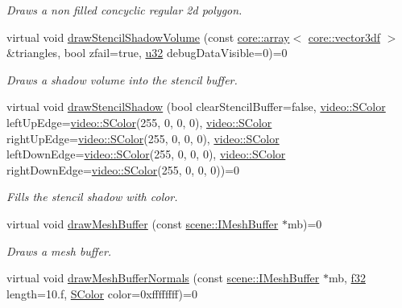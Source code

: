 \begin{DoxyCompactItemize}
\begin{DoxyCompactList}\small\item\em Draws a non filled concyclic regular 2d polygon. \end{DoxyCompactList}\item 
virtual void \hyperlink{classirr_1_1video_1_1IVideoDriver_ae340fe71939b7c1043071507f3330cad}{draw\+Stencil\+Shadow\+Volume} (const \hyperlink{classirr_1_1core_1_1array}{core\+::array}$<$ \hyperlink{namespaceirr_1_1core_a06f169d08b5c429f5575acb7edbad811}{core\+::vector3df} $>$ \&triangles, bool zfail=true, \hyperlink{namespaceirr_a0416a53257075833e7002efd0a18e804}{u32} debug\+Data\+Visible=0)=0
\begin{DoxyCompactList}\small\item\em Draws a shadow volume into the stencil buffer. \end{DoxyCompactList}\item 
virtual void \hyperlink{classirr_1_1video_1_1IVideoDriver_a985ea57c5cf23b7774044f6ed9f96579}{draw\+Stencil\+Shadow} (bool clear\+Stencil\+Buffer=false, \hyperlink{classirr_1_1video_1_1SColor}{video\+::\+S\+Color} left\+Up\+Edge=\hyperlink{classirr_1_1video_1_1SColor}{video\+::\+S\+Color}(255, 0, 0, 0), \hyperlink{classirr_1_1video_1_1SColor}{video\+::\+S\+Color} right\+Up\+Edge=\hyperlink{classirr_1_1video_1_1SColor}{video\+::\+S\+Color}(255, 0, 0, 0), \hyperlink{classirr_1_1video_1_1SColor}{video\+::\+S\+Color} left\+Down\+Edge=\hyperlink{classirr_1_1video_1_1SColor}{video\+::\+S\+Color}(255, 0, 0, 0), \hyperlink{classirr_1_1video_1_1SColor}{video\+::\+S\+Color} right\+Down\+Edge=\hyperlink{classirr_1_1video_1_1SColor}{video\+::\+S\+Color}(255, 0, 0, 0))=0
\begin{DoxyCompactList}\small\item\em Fills the stencil shadow with color. \end{DoxyCompactList}\item 
virtual void \hyperlink{classirr_1_1video_1_1IVideoDriver_ab09507d0b00502912b75e31d2c344e5c}{draw\+Mesh\+Buffer} (const \hyperlink{classirr_1_1scene_1_1IMeshBuffer}{scene\+::\+I\+Mesh\+Buffer} $\ast$mb)=0
\begin{DoxyCompactList}\small\item\em Draws a mesh buffer. \end{DoxyCompactList}\item 
virtual void \hyperlink{classirr_1_1video_1_1IVideoDriver_a1c2ba3fb555e3c7622f3124799440226}{draw\+Mesh\+Buffer\+Normals} (const \hyperlink{classirr_1_1scene_1_1IMeshBuffer}{scene\+::\+I\+Mesh\+Buffer} $\ast$mb, \hyperlink{namespaceirr_a0277be98d67dc26ff93b1a6a1d086b07}{f32} length=10.f, \hyperlink{classirr_1_1video_1_1SColor}{S\+Color} color=0xffffffff)=0

\end{DoxyCompactItemize}
